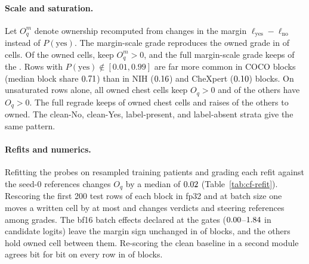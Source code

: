 \documentclass[11pt]{article}
\begin{document}
\paragraph{Scale and saturation.} Let $O^m_q$ denote ownership recomputed from changes in the margin $\ell_{\mathrm{yes}}-\ell_{\mathrm{no}}$ instead of $P(\mathrm{yes})$. The margin-scale grade reproduces the owned grade in \cfScaleAgree{} of \cfScaleAgreeN{} cells. Of the \cfScaleOwned{} owned cells, \cfScaleOwnedMpos{} keep $O^m_q>0$, and the full margin-scale grade keeps \cfScaleOwnedKeepFull{} of the \cfScaleOwned{}. Rows with $P(\mathrm{yes})\notin[0.01,0.99]$ are far more common in COCO blocks (median block share $0.71$) than in NIH ($0.16$) and CheXpert ($0.10$) blocks. On unsaturated rows alone, all \cfScaleUnsatOwned{} owned chest cells keep $O_q>0$ and \cfScaleUnsatOtherPos{} of the \cfScaleUnsatOther{} others have $O_q>0$. The full regrade keeps \cfScaleUnsatGradeKept{} of \cfScaleUnsatGradeN{} owned chest cells and raises \cfScaleUnsatGradeGained{} of the \cfScaleUnsatGradeOtherN{} others to owned. The clean-No, clean-Yes, label-present, and label-absent strata give the same pattern.

\paragraph{Refits and numerics.} Refitting the probes on resampled training patients and grading each refit against the seed-0 references changes $O_q$ by a median of $0.02$ (Table~\ref{tab:cf-refit}). Rescoring the first 200 test rows of each block in fp32 and at batch size one moves a written cell by at most \cfPrecisionMaxDW{} and changes \cfPrecisionVerdictChanges{} verdicts and \cfPrecisionRefChanges{} steering references among \cfPrecisionGradeCells{} grades. The bf16 batch effects declared at the gates ($0.00$--$1.84$ in candidate logits) leave the margin sign unchanged in \cfScaleBatchAgree{} of \cfScaleBatchN{} blocks, and the \cfScaleBatchDisagree{} others hold \cfScaleBatchDisagreeOwned{} owned cell between them. Re-scoring the clean baseline in a second module agrees bit for bit on every row in \cfScaleBaselineIdentical{} of \cfScaleBaselineN{} blocks.
\end{document}
